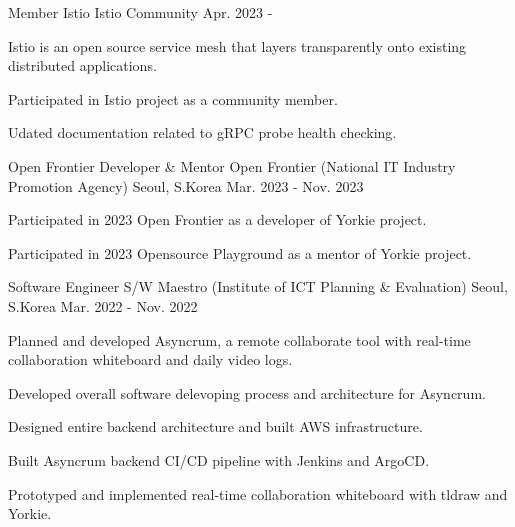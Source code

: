 \begin{cventries}
  \cventry
    {Member} %
    {Istio} %
    {Istio Community} %
    {Apr. 2023 - } %
    {
      \begin{cvitems} %
        \item {Istio is an open source service mesh that layers transparently onto existing distributed applications.}
        \item {Participated in Istio project as a community member.}
        \item {Udated documentation related to gRPC probe health checking.}
      \end{cvitems}
    }

  \cventry
    {Open Frontier Developer \& Mentor} %
    {Open Frontier (National IT Industry Promotion Agency)} %
    {Seoul, S.Korea} %
    {Mar. 2023 - Nov. 2023} %
    {
      \begin{cvitems} %
        \item {Participated in 2023 Open Frontier as a developer of Yorkie project.}
        \item {Participated in 2023 Opensource Playground as a mentor of Yorkie project.}
      \end{cvitems}
    }

  \cventry
    {Software Engineer} %
    {S/W Maestro (Institute of ICT Planning \& Evaluation)} %
    {Seoul, S.Korea} %
    {Mar. 2022 - Nov. 2022} %
    {
      \begin{cvitems} %
        \item {Planned and developed Asyncrum, a remote collaborate tool with real-time collaboration whiteboard and daily video logs.}
        \item {Developed overall software delevoping process and architecture for Asyncrum.}
        \item {Designed entire backend architecture and built AWS infrastructure.}
        \item {Built Asyncrum backend CI/CD pipeline with Jenkins and ArgoCD.}
        \item {Prototyped and implemented real-time collaboration whiteboard with tldraw and Yorkie.}        
      \end{cvitems}
    }


\end{cventries}
